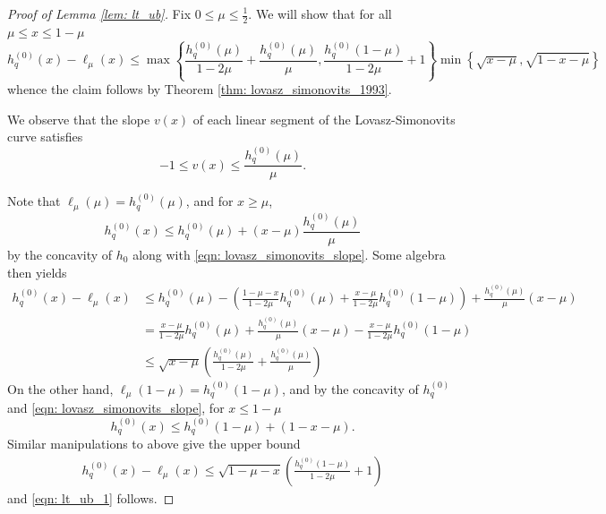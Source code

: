 \documentclass[11pt,twoside]{article}
\newcommand{\set}[1]{\left\{#1\right\}}
\newcommand{\1}{\mathbf{1}}
\begin{document}
\begin{proof}[Proof of Lemma \ref{lem: lt_ub}]
	Fix $0 \leq \mu \leq \frac{1}{2}$. We will show that for all $\mu \leq x \leq 1 - \mu$
	\begin{equation}
	\label{eqn: lt_ub_1}
	h_q^{(0)}(x) - \ell_{\mu}(x) \leq \max \set{\frac{h_q^{(0)}(\mu)}{1 - 2\mu} + \frac{h_q^{(0)}(\mu)}{\mu} , \frac{h_q^{(0)}(1 - \mu) }{1 - 2\mu} + 1 } \min \set{\sqrt{x - \mu},\sqrt{1 - x - \mu}}
	\end{equation}
	whence the claim follows by Theorem \ref{thm: lovasz_simonovits_1993}. 
	
	We observe that the slope $v(x)$ of each linear segment of the Lovasz-Simonovits curve satisfies
	\begin{equation}
	\label{eqn: lovasz_simonovits_slope}
	-1 \leq v(x) \leq \frac{h_q^{(0)}(\mu)}{\mu}.
	\end{equation}
	
	Note that $\ell_{\mu}(\mu) = h_q^{(0)}(\mu)$, and for $x \geq \mu$, 
	\begin{equation*}
	h_q^{(0)}(x) \leq h_q^{(0)}(\mu) + (x - \mu)\frac{h_q^{(0)}(\mu)}{\mu}
	\end{equation*}
	by the concavity of $h_0$ along with \eqref{eqn: lovasz_simonovits_slope}. Some algebra then yields
	\begin{align*}
	h_q^{(0)}(x) - \ell_{\mu}(x) & \leq h_q^{(0)}(\mu) - \left(\frac{1 - \mu - x}{1 - 2\mu} h_q^{(0)}(\mu) + \frac{x - \mu}{1 - 2\mu} h_q^{(0)}(1 - \mu)\right) + \frac{h_q^{(0)}(\mu)}{\mu}(x - \mu) \\
	& =  \frac{x - \mu}{1 - 2\mu}h_q^{(0)}(\mu) + \frac{h_q^{(0)}(\mu)}{\mu} (x - \mu) - \frac{x - \mu}{1 - 2\mu} h_q^{(0)}(1 - \mu) \\
	& \leq \sqrt{x - \mu} \left(\frac{h_q^{(0)}(\mu)}{1 - 2\mu} + \frac{h_q^{(0)}(\mu)}{\mu} \right)
	\end{align*}
	On the other hand, $\ell_{\mu}(1 - \mu) = h_q^{(0)}(1 - \mu)$, and by the concavity of $h_q^{(0)}$ and \eqref{eqn: lovasz_simonovits_slope},  for $x \leq 1 - \mu$
	\begin{equation*}
	h_q^{(0)}(x) \leq h_q^{(0)}(1 - \mu) + (1 - x - \mu).
	\end{equation*}
	Similar manipulations to above give the upper bound
	\begin{align*}
	h_q^{(0)}(x) - \ell_{\mu}(x) \leq \sqrt{1 - \mu - x}\left(\frac{h_q^{(0)}(1 - \mu) }{1 - 2\mu} + 1\right)
	\end{align*}
	and \eqref{eqn: lt_ub_1} follows.
\end{proof}
\end{document}
